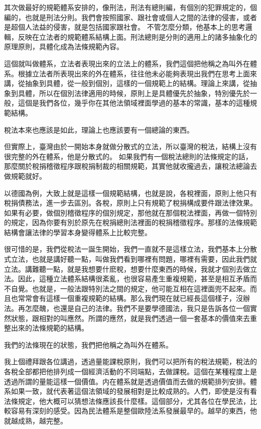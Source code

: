 \documentclass[]{ctexbook}
\begin{document}
其次做最好的規範體系安排的，像刑法，刑法有總則編，有個別的犯罪規定的，個編的，也就是刑法分則。我們會按照國家、跟社會或個人之間的法律的侵害，或者是超個人法益的侵害，就是包括國家跟社會。
不管怎麼分類，他基本上的思考邏輯，反映在立法者的規範體系結構上面。刑法總則是分則的適用上的諸多抽象化的原理原則，具體化成為法條規範內容。

這個就叫做體系，立法者表現出來的立法上的體系，我們這個把他稱之為叫外在體系。根據立法者所表現出來的外在體系，往往他未必能夠表現出我們在思考上面來講，從抽象到具體，從一般到個別，這樣的一個規範上的結構。理論上來講，從抽象到具體，所以在個別法律適用的時候，原則上是具體優先於抽象，特別優先於一般，這個是我們各位，幾乎你在其他法領域裡面學過的基本的常識，基本的這種規範結構。

稅法本來也應該是如此，理論上也應該要有一個總論的東西。

但實際上，臺灣由於一開始本身就做分散式的立法，所以臺灣的稅法，結構上沒有很完整的外在體系，他是分散式的。
如果我們有一個稅法總則的法條規定的話，那麼關於稅捐稽徵程序跟稅捐制裁的相關規範，其實他就收攏過去，讓稅法總論去做規範就好。

以德國為例，大致上就是這樣一個規範結構，也就是說，各稅裡面，原則上他只有稅捐債務法，進一步去區別。各稅，原則上只有規範了稅捐構成要件跟法律效果。如果有必要，做個別稽徵程序的個別規定，那他就在那個稅法裡面，再做一個特別的規定，因為你要有別於原先在稅捐總則法裡面的稅捐稽徵程序。那樣的法條規範結構會讓法律的學習本身變得體系上比較完整。

很可惜的是，我們從稅法一誕生開始，我們一直就不是這樣立法，我們基本上分散式立法，也就是講好聽一點，叫做我們看到哪裡有問題，哪裡有需要，因此我們就立法。講難聽一點，就是我想要什麽稅，想要什麼東西的時候，我就才個別去做立法。因此，這種立法體系結構很紊亂，也很容易產生重複規範，甚至是相互矛盾而不自覺。也就是，一般法跟特別法之間的規定，他可能互相在這裡面兜不起來。而且也常常會有這樣一個重複規範的結構。那么我們現在就已經長這個樣子，沒辦法。再怎麼醜，也還是自己的法律。我們不是要學德國法，我只是告訴各位一個實然狀態，跟相對的叫應然。所謂的應然，就是我們透過一個一套基本的價值來去重整出來的法條規範的結構。

我們的法條現在的狀態，我們把他稱之為叫外在體系。

我上個禮拜跟各位講過，透過量能課稅原則，我們可以把所有的稅法規範，稅法的各稅全部都把他排列成一個經濟活動的不同端點，去做課稅。這個在某種程度上是透過所謂的量能這樣一個價值。内在體系就是透過價值而去做的規範排列安排。體系如果一致，就代表著這個法領域的發展相對是比較成熟的。人們，即使是沒有看法條規定，他大概可以猜想法條應該長什麼樣。這個部分，尤其各位在學民法，比較容易有深刻的感受。因為民法體系是整個歐陸法系發展最早的。越早的東西，他就越成熟，越完整。
\end{document}
